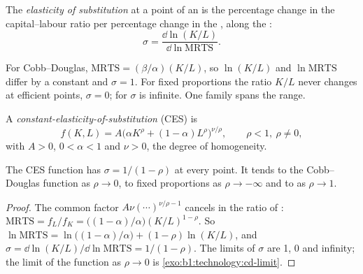 \begin{definition}\label{def:b1:technology:sigma}
The \emph{elasticity of substitution} at a point of an  is the
percentage change in the capital--labour ratio per percentage change in the
, along the :
\[
\sigma = \frac{\dd\ln(K/L)}{\dd\ln\mathrm{MRTS}}.
\]
\end{definition}

For Cobb--Douglas, $\mathrm{MRTS} = (\beta/\alpha)(K/L)$, so $\ln(K/L)$ and
$\ln\mathrm{MRTS}$ differ by a constant and $\sigma = 1$. For fixed proportions
the ratio $K/L$ never changes at efficient points, $\sigma = 0$; for  $\sigma$ is infinite. One family spans the range.

\begin{definition}\label{def:b1:technology:ces}
A \emph{constant-elasticity-of-substitution} (CES)  is
\[
f(K, L) = A\bigl(\alpha K^\rho + (1 - \alpha)L^\rho\bigr)^{\nu/\rho},\qquad \rho < 1,\ \rho \ne 0,
\]
with $A > 0$, $0 < \alpha < 1$ and $\nu > 0$, the degree of homogeneity.
\end{definition}

\begin{proposition}\label{prop:b1:technology:ces-sigma}
The CES function has $\sigma = 1/(1 - \rho)$ at every point. It tends to the
Cobb--Douglas function as $\rho \to 0$, to fixed proportions as $\rho \to -\infty$
and to  as $\rho \to 1$.
\end{proposition}

\begin{proof}
The common factor $A\nu(\cdots)^{\nu/\rho - 1}$ cancels in the ratio of :
$\mathrm{MRTS} = f_L/f_K = \bigl((1 - \alpha)/\alpha\bigr)(K/L)^{1-\rho}$. So
$\ln\mathrm{MRTS} = \ln\bigl((1 - \alpha)/\alpha\bigr) + (1 - \rho)\ln(K/L)$, and
$\sigma = \dd\ln(K/L)/\dd\ln\mathrm{MRTS} = 1/(1 - \rho)$. The limits of $\sigma$ are 1, 0 and
infinity; the limit of the function as $\rho \to 0$ is
\cref{exo:b1:technology:cd-limit}.
\end{proof}

